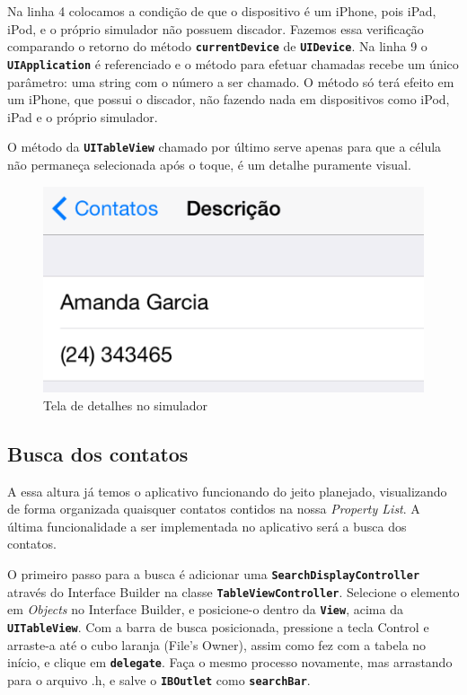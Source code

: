 \documentclass[a4paper,12pt,brazil,oneside]{book}
\begin{document}
Na linha 4 colocamos a condição de que o dispositivo é um iPhone, pois iPad, iPod, e o próprio simulador não possuem discador. Fazemos essa verificação comparando o retorno do método \texttt{\textbf{currentDevice}} de \texttt{\textbf{UIDevice}}. Na linha 9 o \texttt{\textbf{UIApplication}} é referenciado e o método para efetuar chamadas recebe um único parâmetro: uma string com o número a ser chamado. O método só terá efeito em um iPhone, que possui o discador, não fazendo nada em dispositivos como iPod, iPad e o próprio simulador.

O método da \texttt{\textbf{UITableView}} chamado por último serve apenas para que a célula não permaneça selecionada após o toque, é um detalhe puramente visual.

\begin{figure}[H]
  \centering
  \includegraphics[width=.75\textwidth]{figuras/table/table5.png}
  \caption{Tela de detalhes no simulador}
  \label{fig:a}
\end{figure}

\subsection{Busca dos contatos}


A essa altura já temos o aplicativo funcionando do jeito planejado, visualizando de forma organizada quaisquer contatos contidos na nossa \emph{Property List}. A última funcionalidade a ser implementada no aplicativo será a busca dos contatos.

O primeiro passo para a busca é adicionar uma \texttt{\textbf{SearchDisplayController}} através do Interface Builder na classe \texttt{\textbf{TableViewController}}. Selecione o elemento em \emph{Objects} no Interface Builder, e posicione-o dentro da \texttt{\textbf{View}}, acima da \texttt{\textbf{UITableView}}. Com a barra de busca posicionada, pressione a tecla Control e arraste-a até o cubo laranja (File's Owner), assim como fez com a tabela no início, e clique em \texttt{\textbf{delegate}}. Faça o mesmo processo novamente, mas arrastando para o arquivo .h, e salve o \texttt{\textbf{IBOutlet}} como \texttt{\textbf{searchBar}}.
\end{document}
